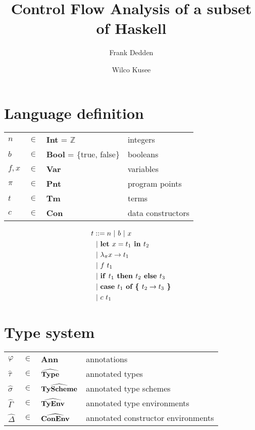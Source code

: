 \documentclass[10pt]{article}
\title{Control Flow Analysis of a subset of Haskell}
\author{Frank Dedden \and Wilco Kusee}
\newcommand{\keyw}[1]{\textrm{\textbf{#1}}}
\newcommand{\GammaH}{\widehat{\Gamma}}
\newcommand{\DeltaH}{\widehat{\Delta}}
\newcommand{\tauH}{\widehat{\tau}}
\newcommand{\sigmaH}{\widehat{\sigma}}
\newcommand{\letin}[2]{\keyw{let~} #1 \keyw{~in~} #2}
\newcommand{\lam}[2]{\keyw{$\lambda_\pi$} #1 \rightarrow #2}
\newcommand{\ite}[3]{\keyw{if~} #1 \keyw{~then~} #2 \keyw{~else~} #3}
\newcommand{\case}[3]{\keyw{case~} #1 \keyw{~of \{~} #2 \rightarrow #3 \keyw{~\}}}
\newcommand{\app}[2]{#1 ~ #2}
\newcommand{\con}[2]{#1 ~ #2}
\begin{document}
\maketitle

\section{Language definition}
\begin{table}[htp]
	\centering
	\begin{tabular}{llll}
		$n$     & $\in$     & \textbf{Int} = $\mathbb{Z}$         & integers\\
		$b$     & $\in$     & \textbf{Bool} = \{true, false\}   & booleans\\
		$f,x$   & $\in$     & \textbf{Var}                      & variables\\
		$\pi$   & $\in$     & \textbf{Pnt}                      & program points\\
		$t$     & $\in$     & \textbf{Tm}                       & terms\\
		$c$     & $\in$     & \textbf{Con}                   & data constructors\\
	\end{tabular}
\end{table}

\begin{align*}
	t   & ::= n ~|~ b ~|~ x\\
		& ~|~ \letin{x = t_1}{t_2}\\
		& ~|~ \lam{x}{t_1}\\
		& ~|~ \app{f}{t_1}\\
		& ~|~ \ite{t_1}{t_2}{t_3}\\
		& ~|~ \case{t_1}{t_2}{t_3}\\
		& ~|~ \con{c}{t_1}\\
\end{align*}


\section{Type system}
\begin{table}[htp]
	\centering
	\begin{tabular}{llll}
		$\varphi$ & $\in$   & \textbf{Ann}                           & annotations\\
		$\tauH$   & $\in$   & $\widehat{\textrm{\textbf{Type}}}$     & annotated types\\
		$\sigmaH$ & $\in$   & $\widehat{\textrm{\textbf{TyScheme}}}$ & annotated type schemes\\
		$\GammaH$ & $\in$   & $\widehat{\textrm{\textbf{TyEnv}}}$    & annotated type environments\\
		$\DeltaH$ & $\in$   & $\widehat{\textrm{\textbf{ConEnv}}}$   & annotated constructor environments
	\end{tabular}
\end{table}
\end{document}
